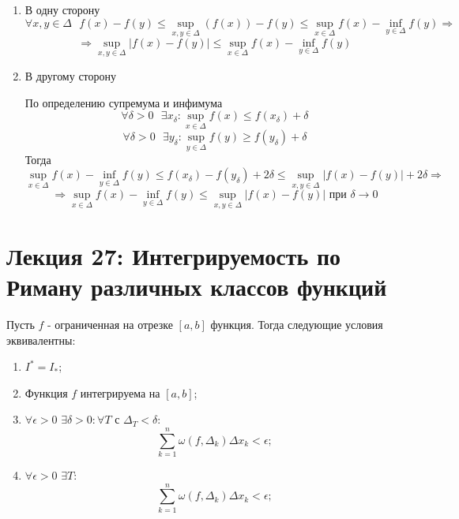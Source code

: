     \begin{explanation}
    	\begin{enumerate}
    		\item В одну сторону
    		\[ \forall x, y \in \Delta \text{ } f(x) - f(y) \leqslant \sup_{x, y \in \Delta} {(f(x))} - f(y) \leqslant \sup_{x \in \Delta} {f(x)} - \inf_{y \in \Delta} {f(y)} \Rightarrow \]
    		\[ \Rightarrow \sup_{x, y \in \Delta}{|f(x) - f(y)|} \leqslant \sup_{x \in \Delta}{f(x)} - \inf_{y \in \Delta}{f(y)} \] 
    		\item В другому сторону
    		
    		По определению супремума и инфимума
    		\[ \forall \delta > 0 \text{ } \exists x_{\delta}: \sup_{x \in \Delta} {f(x)} \leqslant f(x_{\delta}) + \delta \]
    		\[ \forall \delta > 0 \text{ } \exists y_{\delta}: \sup_{y \in \Delta} {f(y)} \geqslant f(y_{\delta}) + \delta \]
    		Тогда
    		\[ \sup_{x \in \Delta} {f(x)} - \inf_{y \in \Delta}{f(y)} \leqslant f(x_{\delta}) - f(y_{\delta}) + 2\delta \leqslant  \sup_{x, y \in \Delta} {|f(x) - f(y)|} + 2\delta \Rightarrow \]
    		\[ \Rightarrow \sup_{x \in \Delta} {f(x)} - \inf_{y \in \Delta}{f(y)} \leqslant  \sup_{x, y \in \Delta} {|f(x) - f(y)|} \text{ при } \delta \to 0 \]
    	\end{enumerate}
    \end{explanation}
    
    \newpage
    
    \section{Лекция 27: Интегрируемость по Риману различных классов функций}
    
    \begin{theorem}
    	Пусть $f$ - ограниченная на отрезке $[a, b]$ функция. Тогда следующие условия эквивалентны:
    	\begin{enumerate}
    		\item $I^{*} = I_{*}$;
    		\item Функция $f$ интегрируема на $[a, b]$;
    		\item $\forall \epsilon > 0$ $\exists \delta > 0: \forall T$ с $\Delta_T < \delta:$
    		\[ \sum_{k = 1}^{n} \omega(f, \Delta_k) \Delta x_k < \epsilon; \]
    		\item $\forall \epsilon > 0$ $\exists T:$
    		\[ \sum_{k = 1}^{n} \omega(f, \Delta_k) \Delta x_k < \epsilon; \]
    	\end{enumerate}
    \end{theorem}
    
